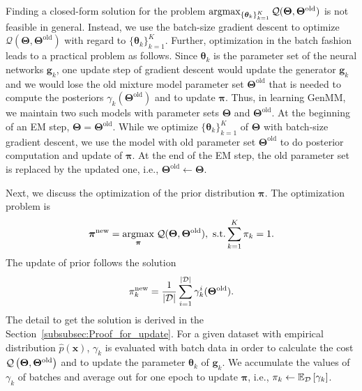 Finding a closed-form solution for the problem $\operatorname{argmax}_{\{\bm{\theta}_k\}_{k=1}^{K}}{\mathcal{Q}(\bm{\Theta},\bm{\Theta}^{\mathrm{old}})}$ is not feasible in general. Instead, we use the batch-size gradient descent to optimize $\mathcal{Q} (\bm{\Theta},\bm{\Theta}^{\mathrm{old}})$ with regard to $\{\bm{\theta}_k\}_{k=1}^{K}$.
Further, optimization in the batch fashion leads to a practical problem as follows. 
Since $\bm{\theta}_k$ is the parameter set of the neural networks $\bm{g}_k$, one update step of gradient descent would update the generator $\bm{g}_k$ and we would lose the old mixture model parameter set $\bm{\Theta}^{\mathrm{old}}$ that is needed to compute the posteriors $\gamma_k(\bm{\Theta}^{\mathrm{old}})$ and to update $\bm{\pi}$. Thus, in learning GenMM, we maintain two such models with parameter sets $\bm{\Theta}$ and $\bm{\Theta}^{\mathrm{old}}$. At the beginning of an EM step, $\bm{\Theta} = \bm{\Theta}^{\mathrm{old}}$. While we optimize $\{\bm{\theta}_k\}_{k=1}^{K}$ of $\bm{\Theta}$ with batch-size gradient descent, we use the model with old parameter set $\bm{\Theta}^{\mathrm{old}}$ to do posterior computation and update of $\bm{\pi}$. At the end of the EM step, the old parameter set is replaced by the updated one, i.e., $\bm{\Theta}^{\mathrm{old}}\gets \bm{\Theta}$.



Next, we discuss the optimization of the prior distribution $\bm{\pi}$. The optimization problem is 
\begin{equation}\label{eq-pi-update1}
  \bm{\pi}^{\mathrm{new}} = \underset{\bm{\pi}}{\operatorname{argmax}}\;{ \mathcal{Q}
    (\bm{\Theta},\bm{\Theta}^{\mathrm{old}})}, \,\,
  \mathrm{s.t.} \sum_{k=1}^{K}\pi_k = 1.
\end{equation}
The update of prior follows the solution
\begin{equation}\label{eq-pi-solution}
  \pi_k^{\mathrm{new}} = \frac{1}{| \mathcal{D} |}\sum_{i=1}^{| \mathcal{D} |}\gamma_k^{i}(\bm{\Theta}^{\mathrm{old}}).
\end{equation}
The detail to get the solution is derived in the Section~\ref{subsubsec:Proof_for_update}. For a given dataset with empirical distribution $\hat{p}(\bm{x})$,
$\gamma_k$ is evaluated with batch data in order to calculate the cost
$\mathcal{Q}\left(\bm{\Theta},\bm{\Theta}^{\mathrm{old}}\right)$ and to update the
parameter $\bm{\theta}_k$ of $\bm{g}_k$. We accumulate the values of $\gamma_k$ of batches and
average out for one epoch to update $\bm{\pi}$, {i.e.}, $\pi_k \gets \mathbb{E}_{\mathcal{D}}\left[ \gamma_k \right]$.



